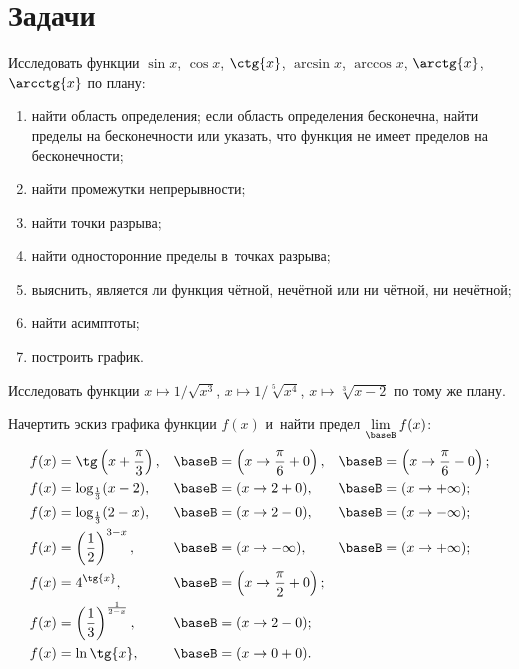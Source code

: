 \section{Задачи}
\begin{exersize}
	Исследовать функции $\sin{x}$, $\cos{x}$, $\ctg{x}$, $\arcsin{x}$, $\arccos{x}$, $\arctg{x}$, $\arcctg{x}$ по плану:
	\begin{enumerate}[1)]
		\item найти область определения; если область определения бесконечна, найти
			пределы на бесконечности или указать, что функция не имеет пределов на
			бесконечности;
		\item найти промежутки непрерывности;
		\item найти точки разрыва;
		\item найти односторонние пределы в~точках разрыва;
		\item выяснить, является ли функция чётной, нечётной или ни чётной, ни
			нечётной;
		\item найти асимптоты;
		\item построить график.
	\end{enumerate}
\end{exersize}

\begin{exersize}
	Исследовать функции $x \mapsto 1/\sqrt{x^3}$, $x \mapsto 1/\sqrt[5]{x^4}$, $x
	\mapsto \sqrt[3]{x-2}$ по тому же плану.
\end{exersize}

\begin{exersize}
	Начертить эскиз графика функции $f(x)$ и~найти предел $\lim\limits_{\baseB} f(x)$:
	\begin{align*}
		f(x) &= \tg \left( x + \frac{\pi}{3} \right), &
		\baseB &= \left( x \to \frac{\pi}{6} + 0 \right), &
		\baseB &= \left( x \to \frac{\pi}{6} - 0 \right);
		\\
		f(x) &= \log_{\frac{1}{3}} (x-2), &
		\baseB &= (x \to 2+0), &
		\baseB &= (x \to +\infty);
		\\
		f(x) &= \log_{\frac{1}{3}} (2-x), &
		\baseB &= (x \to 2-0), &
		\baseB &= (x \to -\infty);
		\\
		f(x) &= \left( \frac{1}{2} \right)^{3-x}, &
		\baseB &= (x \to -\infty), &
		\baseB &= (x \to +\infty);
		\\
		f(x) &= 4^{\tg{x}}, &
		\baseB &= \left( x \to \frac{\pi}{2} + 0 \right);
		\\
		f(x) &= \left( \frac{1}{3} \right)^{\frac{1}{2-x}}, &
		\baseB &= (x \to 2 - 0);
		\\
		f(x) &= \ln{\tg{x}}, &
		\baseB &= (x \to 0+0).
	\end{align*}
\end{exersize}


